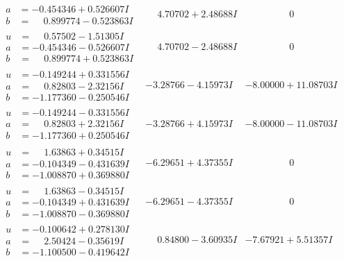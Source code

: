 \documentclass[1p]{elsarticle_modified}
\theoremstyle{definition}
\begin{document}
$$\begin{array}{c|c|c}
\begin{aligned}
a &= -0.454346 + 0.526607 I \\
b &= \phantom{-}0.899774 - 0.523863 I\end{aligned}
 & \phantom{-}4.70702 + 2.48688 I & \phantom{-0.000000 } 0 \\ \hline\begin{aligned}
u &= \phantom{-}0.57502 - 1.51305 I \\
a &= -0.454346 - 0.526607 I \\
b &= \phantom{-}0.899774 + 0.523863 I\end{aligned}
 & \phantom{-}4.70702 - 2.48688 I & \phantom{-0.000000 } 0 \\ \hline\begin{aligned}
u &= -0.149244 + 0.331556 I \\
a &= \phantom{-}0.82803 - 2.32156 I \\
b &= -1.177360 - 0.250546 I\end{aligned}
 & -3.28766 - 4.15973 I & -8.00000 + 11.08703 I \\ \hline\begin{aligned}
u &= -0.149244 - 0.331556 I \\
a &= \phantom{-}0.82803 + 2.32156 I \\
b &= -1.177360 + 0.250546 I\end{aligned}
 & -3.28766 + 4.15973 I & -8.00000 - 11.08703 I \\ \hline\begin{aligned}
u &= \phantom{-}1.63863 + 0.34515 I \\
a &= -0.104349 - 0.431639 I \\
b &= -1.008870 + 0.369880 I\end{aligned}
 & -6.29651 + 4.37355 I & \phantom{-0.000000 } 0 \\ \hline\begin{aligned}
u &= \phantom{-}1.63863 - 0.34515 I \\
a &= -0.104349 + 0.431639 I \\
b &= -1.008870 - 0.369880 I\end{aligned}
 & -6.29651 - 4.37355 I & \phantom{-0.000000 } 0 \\ \hline\begin{aligned}
u &= -0.100642 + 0.278130 I \\
a &= \phantom{-}2.50424 - 0.35619 I \\
b &= -1.100500 - 0.419642 I\end{aligned}
 & \phantom{-}0.84800 - 3.60935 I & -7.67921 + 5.51357 I \\ \hline\begin{aligned}

\end{aligned}
\end{array}$$
\end{document}

